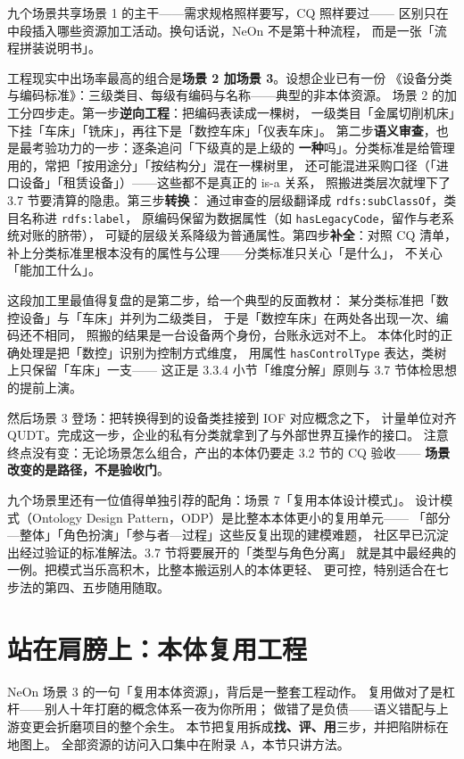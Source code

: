 九个场景共享场景 1 的主干——需求规格照样要写，CQ 照样要过——
区别只在中段插入哪些资源加工活动。换句话说，NeOn 不是第十种流程，
而是一张「流程拼装说明书」。

工程现实中出场率最高的组合是\textbf{场景 2 加场景 3}。设想企业已有一份
《设备分类与编码标准》：三级类目、每级有编码与名称——典型的非本体资源。
场景 2 的加工分四步走。第一步\textbf{逆向工程}：把编码表读成一棵树，
一级类目「金属切削机床」下挂「车床」「铣床」，再往下是「数控车床」「仪表车床」。
第二步\textbf{语义审查}，也是最考验功力的一步：逐条追问「下级真的是上级的
\textbf{一种}吗」。分类标准是给管理用的，常把「按用途分」「按结构分」混在一棵树里，
还可能混进采购口径（「进口设备」「租赁设备」）——这些都不是真正的 is-a 关系，
照搬进类层次就埋下了 3.7 节要清算的隐患。第三步\textbf{转换}：
通过审查的层级翻译成 \texttt{rdfs:subClassOf}，类目名称进 \texttt{rdfs:label}，
原编码保留为数据属性（如 \texttt{hasLegacyCode}，留作与老系统对账的脐带），
可疑的层级关系降级为普通属性。第四步\textbf{补全}：对照 CQ 清单，
补上分类标准里根本没有的属性与公理——分类标准只关心「是什么」，
不关心「能加工什么」。

这段加工里最值得复盘的是第二步，给一个典型的反面教材：
某分类标准把「数控设备」与「车床」并列为二级类目，
于是「数控车床」在两处各出现一次、编码还不相同，
照搬的结果是一台设备两个身份，台账永远对不上。
本体化时的正确处理是把「数控」识别为控制方式维度，
用属性 \texttt{hasControlType} 表达，类树上只保留「车床」一支——
这正是 3.3.4 小节「维度分解」原则与 3.7 节体检思想的提前上演。

然后场景 3 登场：把转换得到的设备类挂接到 IOF 对应概念之下，
计量单位对齐 QUDT。完成这一步，企业的私有分类就拿到了与外部世界互操作的接口。
注意终点没有变：无论场景怎么组合，产出的本体仍要走 3.2 节的 CQ 验收——
\textbf{场景改变的是路径，不是验收门}。

九个场景里还有一位值得单独引荐的配角：场景 7「复用本体设计模式」。
设计模式（Ontology Design Pattern，ODP）是比整本本体更小的复用单元——
「部分—整体」「角色扮演」「参与者—过程」这些反复出现的建模难题，
社区早已沉淀出经过验证的标准解法。3.7 节将要展开的「类型与角色分离」
就是其中最经典的一例。把模式当乐高积木，比整本搬运别人的本体更轻、
更可控，特别适合在七步法的第四、五步随用随取。

\section{站在肩膀上：本体复用工程}

NeOn 场景 3 的一句「复用本体资源」，背后是一整套工程动作。
复用做对了是杠杆——别人十年打磨的概念体系一夜为你所用；
做错了是负债——语义错配与上游变更会折磨项目的整个余生。
本节把复用拆成\textbf{找、评、用}三步，并把陷阱标在地图上。
全部资源的访问入口集中在附录 A，本节只讲方法。

